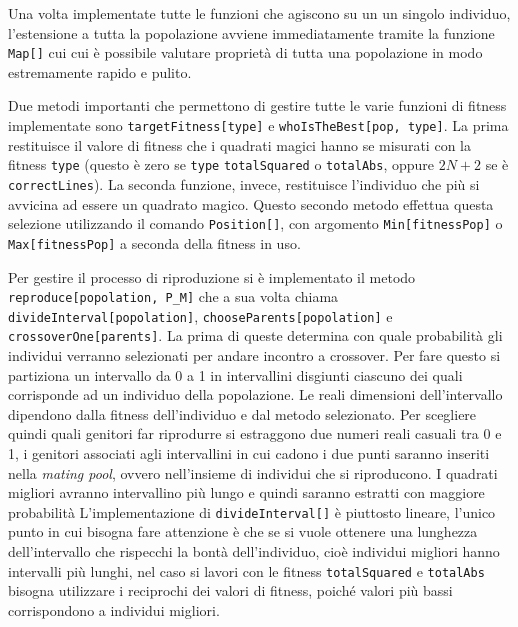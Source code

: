 \documentclass[italian,twoside,twocolumn]{article}
\begin{document}
Una volta implementate tutte le funzioni che agiscono su un un singolo individuo, l'estensione a tutta la popolazione avviene immediatamente tramite la funzione \texttt{Map[]} cui cui è possibile valutare proprietà di tutta una popolazione in modo estremamente rapido e pulito. 

Due metodi importanti che permettono di gestire tutte le varie funzioni di fitness implementate sono \texttt{targetFitness[type]} e \texttt{whoIsTheBest[pop, type]}. La prima restituisce il valore di fitness che i quadrati magici hanno se misurati con la fitness \texttt{type} (questo è zero se \texttt{type} \texttt{totalSquared} o \texttt{totalAbs}, oppure $ 2 N + 2 $ se è  \texttt{correctLines}). La seconda funzione, invece, restituisce l'individuo che più si avvicina ad essere un quadrato magico. Questo secondo metodo effettua questa selezione utilizzando il comando \texttt{Position[]}, con argomento \texttt{Min[fitnessPop]} o \texttt{Max[fitnessPop]} a seconda della fitness in uso.

Per gestire il processo di riproduzione si è implementato il metodo \texttt{reproduce[popolation, P\_M]} che a sua volta chiama \texttt{divideInterval[popolation]}, \texttt{chooseParents[popolation]} e \texttt{crossoverOne[parents]}. La prima di queste determina con quale probabilità gli individui verranno selezionati per andare incontro a crossover. Per fare questo si partiziona un intervallo da 0 a 1 in intervallini disgiunti ciascuno dei quali corrisponde ad un individuo della popolazione. Le reali dimensioni dell'intervallo dipendono dalla fitness dell'individuo e dal metodo selezionato. Per scegliere quindi quali genitori far riprodurre si estraggono due numeri reali casuali tra 0 e 1, i genitori associati agli intervallini in cui cadono i due punti saranno inseriti nella \emph{mating pool}, ovvero nell'insieme di individui che si riproducono. I quadrati migliori avranno intervallino più lungo e quindi saranno estratti con maggiore probabilità L'implementazione di \texttt{divideInterval[]} è piuttosto lineare, l'unico punto in cui bisogna fare attenzione è che se si vuole ottenere una lunghezza dell'intervallo che rispecchi la bontà dell'individuo, cioè individui migliori hanno intervalli più lunghi, nel caso si lavori con le fitness \texttt{totalSquared} e \texttt{totalAbs} bisogna utilizzare i reciprochi dei valori di fitness, poiché valori più bassi corrispondono a individui migliori.
\end{document}
